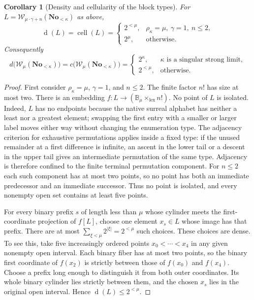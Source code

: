 \documentclass[11pt]{article}
\newtheorem{corollary}[corollary]{Corollary}
\theoremstyle{definition}
\theoremstyle{remark}
\newcommand{\No}{\mathbf{No}}
\newcommand{\WO}{\mathcal W}
\newcommand{\B}{\mathbb B}
\newcommand{\lex}{\mathrm{lex}}
\newcommand{\dens}{\operatorname{d}}
\newcommand{\cell}{\operatorname{cell}}
\begin{document}
\begin{corollary}[Density and cellularity of the block types]
\label{swo:cb:new:cor:block-density}
For $L=\WO_{\mu\cdot\gamma+n}(\No_{<\kappa})$ as above,
\[
 \dens(L)=\cell(L)=
 \begin{cases}
 2^{<\mu},&\rho_\kappa=\mu,\ \gamma=1,\ n\leq2,\\
 2^\mu,&\text{otherwise}.
 \end{cases}
\]
Consequently
\[
 d\bigl(\WO_\mu(\No_{<\kappa})\bigr)
 =c\bigl(\WO_\mu(\No_{<\kappa})\bigr)
 =
 \begin{cases}
 2^\kappa,&\kappa\text{ is a singular strong limit},\\
 2^{<\mu},&\text{otherwise}.
 \end{cases}
\]
\end{corollary}
\begin{proof}
First consider $\rho_\kappa=\mu$, $\gamma=1$, and $n\leq2$.
The finite factor $n!$ has size at most two.  There is an embedding
$f:L\to (\B_{\mu}\times_{\lex}n!)$.  No point of $L$ is isolated.  Indeed, $L$
has no endpoints because the native surreal alphabet has neither a
least nor a greatest element; swapping the first entry with a smaller
or larger label moves either way without changing the enumeration type.
The adjacency criterion for exhaustive permutations applies inside a
fixed type: if the unused remainder at a first difference is infinite,
an ascent in the lower tail or a descent in the upper tail gives an
intermediate permutation of the same type.  Adjacency is therefore
confined to the finite terminal permutation component.  For $n\leq2$
each such component has at most two points, so no point has both an
immediate predecessor and an immediate successor.  Thus no point is
isolated, and every nonempty open set contains at least five points.

For every binary prefix $s$ of length less than $\mu$ whose cylinder
meets the first-coordinate projection of $f[L]$, choose one element
$x_s\in L$ whose image has that prefix.  There are at most
$\sum_{\xi<\mu}2^{|\xi|}=2^{<\mu}$ such choices.  These choices are
dense.  To see this, take five increasingly ordered points
$x_0<\cdots<x_4$ in any given nonempty open interval.  Each binary
fiber has at most two points, so the binary first coordinate of
$f(x_2)$ is strictly between those of $f(x_0)$ and $f(x_4)$.
Choose a prefix long enough to distinguish it from both outer
coordinates.  Its whole binary cylinder lies strictly between them,
and the chosen $x_s$ lies in the original open interval.  Hence
$\dens(L)\leq2^{<\mu}$.


\end{proof}
\end{document}
